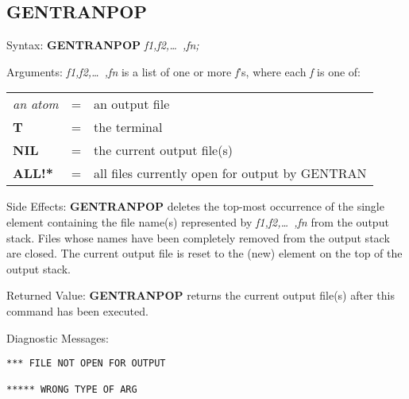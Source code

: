 \subsection{GENTRANPOP}
\begin{describe}{Syntax:}
{\bf GENTRANPOP} {\it f1,f2,\dots\ ,fn;}
\end{describe}
\begin{describe}{Arguments:}
{\it f1,f2,\dots\ ,fn\/} is a list of one or more {\it f\/}'s, where each 
{\it f\/} is one of:
\begin{center}
\begin{tabular}{lll}
{\it an atom} & = & an output file\\
{\bf T} & = & the terminal\\
{\bf NIL} & = & the current output file(s)\\
{\bf ALL!*} & = & all files currently open for output by GENTRAN\\
\end{tabular}
\end{center}
\end{describe}
\begin{describe}{Side Effects:}
{\bf GENTRANPOP} deletes the top-most occurrence of the single element
containing the file name(s) represented by {\it f1,f2,\dots\ ,fn\/}
from the output stack.  Files whose names have been completely removed from
the output stack are closed.  The current output file is reset to the
(new) element on the top of the output stack.
\end{describe}
\begin{describe}{Returned Value:}
{\bf GENTRANPOP} returns the current output file(s) after this command
has been executed.
\end{describe}
\begin{describe}{Diagnostic Messages:}
\begin{verbatim}
*** FILE NOT OPEN FOR OUTPUT

***** WRONG TYPE OF ARG
\end{verbatim}
\end{describe}
